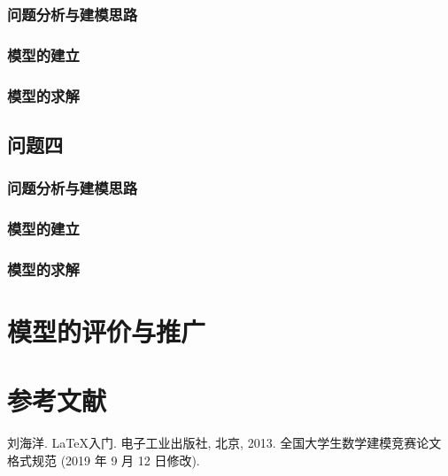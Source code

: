 \documentclass[withoutpreface,bwprint]{cumcmthesis} %
\begin{document}
	\subsubsection{问题分析与建模思路}


	\subsubsection{模型的建立}


	\subsubsection{模型的求解}


\subsection{问题四}
	\subsubsection{问题分析与建模思路}


	\subsubsection{模型的建立}


	\subsubsection{模型的求解}

\section{模型的评价与推广}


\section{参考文献}

\begin{thebibliography}{9}%
    刘海洋.
    \newblock \LaTeX {}入门\allowbreak[J].
    \newblock 电子工业出版社, 北京, 2013.
    全国大学生数学建模竞赛论文格式规范 (2019 年 9 月 12 日修改).
\end{thebibliography}
\end{document}
